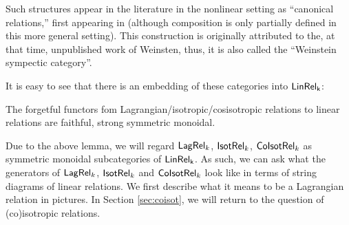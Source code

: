 Such structures appear in the literature in the nonlinear setting as ``canonical relations,'' first appearing in \cite{Guillemin} (although composition is only partially defined in this more general setting).  This construction is  originally attributed to the, at that time, unpublished work of Weinsten, thus, it is also called the ``Weinstein sympectic category''.




It is easy to see that there is an embedding of these categories into $\sf LinRel_k$:
\begin{lemma}
\label{lemma:strong}
The forgetful functors fom Lagrangian/isotropic/cosisotropic relations to linear relations  are faithful, strong symmetric monoidal.
\end{lemma}
Due to the above lemma, we will regard $\mathsf{Lag}\mathsf{Rel}_k$, ${\sf Isot}\mathsf{Rel}_k$, ${\sf Co}{\sf Isot}\mathsf{Rel}_k$ as symmetric monoidal subcategories of $\sf LinRel_k$.
As such, we can ask what the generators of $\mathsf{Lag}\mathsf{Rel}_k$, ${\sf Isot}\mathsf{Rel}_k$ and ${\sf Co}{\sf Isot}\mathsf{Rel}_k$ look like in terms of string diagrams of linear relations. We first describe what it means to be a Lagrangian relation in pictures.  In Section \ref{sec:coisot}, we will return to the question of (co)isotropic relations.

